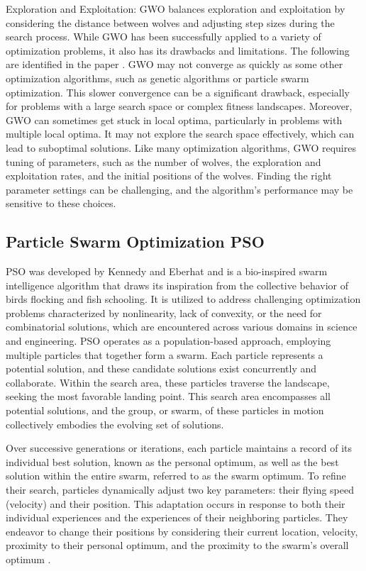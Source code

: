 \documentclass[conference]{IEEEtran}
\begin{document}
\begin{abstract1}
Exploration and Exploitation: GWO balances exploration and exploitation by considering the distance between wolves and adjusting step sizes during the search process.
While GWO has been successfully applied to a variety of optimization problems, it also has its drawbacks and limitations. The following are identified in the paper \cite{hou2022improved}. GWO may not converge as quickly as some other optimization algorithms, such as genetic algorithms or particle swarm optimization. This slower convergence can be a significant drawback, especially for problems with a large search space or complex fitness landscapes.
Moreover, GWO can sometimes get stuck in local optima, particularly in problems with multiple local optima. It may not explore the search space effectively, which can lead to suboptimal solutions.
Like many optimization algorithms, GWO requires tuning of parameters, such as the number of wolves, the exploration and exploitation rates, and the initial positions of the wolves. Finding the right parameter settings can be challenging, and the algorithm's performance may be sensitive to these choices.


\subsection{Particle Swarm Optimization PSO }
PSO was developed by Kennedy and Eberhat \cite{kennedy1995particle} and is a bio-inspired swarm intelligence algorithm that draws its inspiration from the collective behavior of birds flocking and fish schooling. It is utilized to address challenging optimization problems characterized by nonlinearity, lack of convexity, or the need for combinatorial solutions, which are encountered across various domains in science and engineering.
PSO operates as a population-based approach, employing multiple particles that together form a swarm. Each particle represents a potential solution, and these candidate solutions exist concurrently and collaborate. Within the search area, these particles traverse the landscape, seeking the most favorable landing point. This search area encompasses all potential solutions, and the group, or swarm, of these particles in motion collectively embodies the evolving set of solutions.

Over successive generations or iterations, each particle maintains a record of its individual best solution, known as the personal optimum, as well as the best solution within the entire swarm, referred to as the swarm optimum. To refine their search, particles dynamically adjust two key parameters: their flying speed (velocity) and their position. This adaptation occurs in response to both their individual experiences and the experiences of their neighboring particles. They endeavor to change their positions by considering their current location, velocity, proximity to their personal optimum, and the proximity to the swarm's overall optimum \cite{wang2018particle}.


\end{abstract1}
\end{document}
